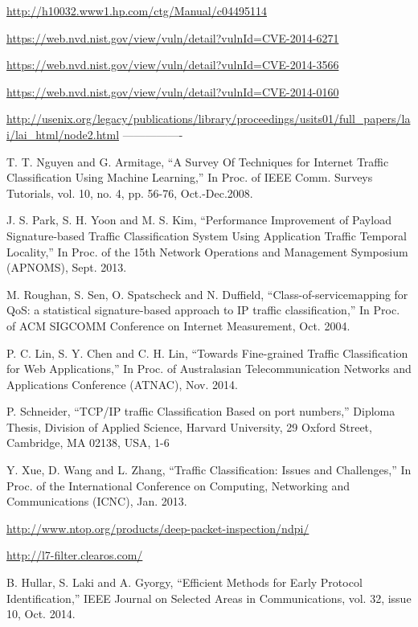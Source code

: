 \begin{thebibliography}{1}
\url{http://h10032.www1.hp.com/ctg/Manual/c04495114}

\url{https://web.nvd.nist.gov/view/vuln/detail?vulnId=CVE-2014-6271}

\url{https://web.nvd.nist.gov/view/vuln/detail?vulnId=CVE-2014-3566}

\url{https://web.nvd.nist.gov/view/vuln/detail?vulnId=CVE-2014-0160}

\url{http://usenix.org/legacy/publications/library/proceedings/usits01/full_papers/lai/lai_html/node2.html}
----------------

T. T. Nguyen and G. Armitage, 
``A Survey Of Techniques for Internet Traffic Classification Using Machine Learning,'' In Proc. of IEEE Comm. Surveys Tutorials, vol. 10, no. 4, pp. 56-76, Oct.-Dec.2008.

J. S. Park, S. H. Yoon and M. S. Kim,
``Performance Improvement of Payload Signature-based Traffic Classification System Using Application Traffic Temporal Locality,'' In Proc. of the 15th Network Operations and Management Symposium (APNOMS), Sept. 2013. 

M. Roughan, S. Sen, O. Spatscheck and N. Duffield, 
``Class-of-servicemapping for QoS: a statistical signature-based approach to IP traffic classification,''  In Proc. of ACM SIGCOMM Conference on Internet Measurement, Oct. 2004.

P. C. Lin, S. Y. Chen and C. H. Lin, 
``Towards Fine-grained Traffic Classification for Web Applications,'' In Proc. of Australasian Telecommunication Networks and Applications Conference (ATNAC), Nov. 2014.

P. Schneider,
``TCP/IP traffic Classification Based on port numbers,'' Diploma Thesis, Division of Applied Science, Harvard University, 29 Oxford Street, Cambridge, MA 02138, USA, 1-6

Y. Xue, D. Wang and L. Zhang,
``Traffic Classification: Issues and Challenges,'' In Proc. of the International Conference on Computing, Networking and Communications (ICNC), Jan. 2013.

\url{http://www.ntop.org/products/deep-packet-inspection/ndpi/}

\url{http://l7-filter.clearos.com/}

B. Hullar, S. Laki and A. Gyorgy,
``Efficient Methods for Early Protocol Identification,'' IEEE Journal on Selected Areas in Communications,  vol. 32, issue 10, Oct. 2014. 


\end{thebibliography}

